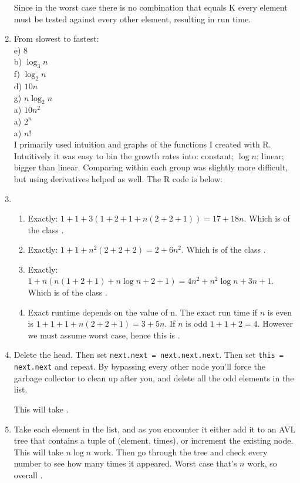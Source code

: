 \documentclass[12pt]{chmullighw}
\begin{document}
\begin{enumerate}
Since in the worst case there is no combination that equals K every element must
be tested against every other element, resulting in  run time.

\item From slowest to fastest: \\
e) 8 \\
b) $\log_3n$ \\
f) $\log_2n$ \\
d) $10n$ \\
g) $n\log_2n$ \\
a) $10n^2$ \\
a) $2^n$ \\
a) $n!$ \\

I primarily used intuition and graphs of the functions I created with R.
Intuitively it was easy to bin the growth rates into: constant; $\log n$; linear;
bigger than linear. Comparing within each group was slightly more difficult, but
using derivatives helped as well. The R code is below:



\item
\begin{enumerate}
\item Exactly: $1 + 1 + 3(1+2+1+n(2+2+1)) = 17+18n$. Which is of the class .
\item Exactly: $1+1+n^2(2+2+2) = 2+6n^2$. Which is of the class .
\item Exactly: $1+ n(n(1+2+1) + n\log n + 2 + 1) = 4n^2 + n^2\log n + 3n + 1$. Which is of the class .
\item Exact runtime depends on the value of n. The exact run time if $n$ is even
is $1 + 1 + 1 + n(2+2+1) = 3+5n$. If $n$ is odd $1+1+2=4$. However we must assume
worst case, hence this is .
\end{enumerate}

\item Delete the head. Then set \texttt{next.next = next.next.next}. Then set
\texttt{this = next.next} and repeat. By bypassing every other node you'll force the garbage collector to clean up after you, and delete all the odd elements in the list.

This will take .

\item Take each element in the list, and as you encounter it either add it to an
AVL tree that contains a tuple of (element, times), or increment the existing node.
This will take $n \log n$ work. Then go through the tree and check every number
to see how many times it appeared. Worst case that's $n$ work, so overall .


\end{enumerate}
\end{document}
